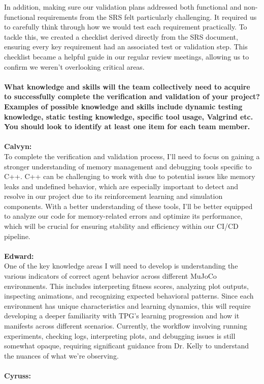 \documentclass[12pt, titlepage]{article}
\begin{document}
In addition, making sure our validation plans addressed both functional and non-functional requirements from the SRS felt particularly challenging. It required us to carefully think through how we would test each requirement practically. To tackle this, we created a checklist derived directly from the SRS document, ensuring every key requirement had an associated test or validation step. This checklist became a helpful guide in our regular review meetings, allowing us to confirm we weren’t overlooking critical areas.
\\\\
\textbf{What knowledge and skills will the team collectively need to acquire to
  successfully complete the verification and validation of your project?
  Examples of possible knowledge and skills include dynamic testing knowledge,
  static testing knowledge, specific tool usage, Valgrind etc.  You should look to identify at least one item for each team member.}
\\\\
    \textbf{Calvyn:}\\
    
    \noindent To complete the verification and validation process,  I’ll need to focus on gaining a stronger understanding of memory management and debugging tools specific to C++. C++ can be challenging to work with due to potential issues like memory leaks and undefined behavior, which are especially important to detect and resolve in our project due to its reinforcement learning and simulation components. With a better understanding of these tools, I’ll be better equipped to analyze our code for memory-related errors and optimize its performance, which will be crucial for ensuring stability and efficiency within our CI/CD pipeline.
\\\\
    \textbf{Edward:}\\
  
    \noindent One of the key knowledge areas I will need to develop is understanding the various indicators of correct agent behavior across different MuJoCo environments. This includes interpreting fitness scores, analyzing plot outputs, inspecting animations, and recognizing expected behavioral patterns. Since each environment has unique characteristics and learning dynamics, this will require developing a deeper familiarity with TPG's learning progression and how it manifests across different scenarios. Currently, the workflow involving running experiments, checking logs, interpreting plots, and debugging issues is still somewhat opaque, requiring significant guidance from Dr. Kelly to understand the nuances of what we're observing.
\\\\
    \textbf{Cyruss:}\\
    
\end{document}
